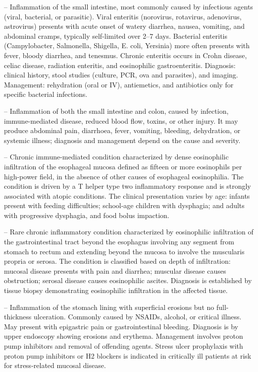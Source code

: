 -- Inflammation of the small intestine, most commonly caused by infectious agents (viral, bacterial, or parasitic). Viral enteritis (norovirus, rotavirus, adenovirus, astrovirus) presents with acute onset of watery diarrhea, nausea, vomiting, and abdominal cramps, typically self-limited over 2--7 days. Bacterial enteritis (Campylobacter, Salmonella, Shigella, E. coli, Yersinia) more often presents with fever, bloody diarrhea, and tenesmus. Chronic enteritis occurs in Crohn disease, celiac disease, radiation enteritis, and eosinophilic gastroenteritis. Diagnosis: clinical history, stool studies (culture, PCR, ova and parasites), and imaging. Management: rehydration (oral or IV), antiemetics, and antibiotics only for specific bacterial infections.

-- Inflammation of both the small intestine and colon, caused by infection, immune-mediated disease, reduced blood flow, toxins, or other injury. It may produce abdominal pain, diarrhoea, fever, vomiting, bleeding, dehydration, or systemic illness; diagnosis and management depend on the cause and severity.

-- Chronic immune-mediated condition characterized by dense eosinophilic infiltration of the esophageal mucosa defined as fifteen or more eosinophils per high-power field, in the absence of other causes of esophageal eosinophilia. The condition is driven by a T helper type two inflammatory response and is strongly associated with atopic conditions. The clinical presentation varies by age: infants present with feeding difficulties; school-age children with dysphagia; and adults with progressive dysphagia, and food bolus impaction.

-- Rare chronic inflammatory condition characterized by eosinophilic infiltration of the gastrointestinal tract beyond the esophagus involving any segment from stomach to rectum and extending beyond the mucosa to involve the muscularis propria or serosa. The condition is classified based on depth of infiltration: mucosal disease presents with pain and diarrhea; muscular disease causes obstruction; serosal disease causes eosinophilic ascites. Diagnosis is established by tissue biopsy demonstrating eosinophilic infiltration in the affected tissue.

-- Inflammation of the stomach lining with superficial erosions but no full-thickness ulceration. Commonly caused by NSAIDs, alcohol, or critical illness. May present with epigastric pain or gastrointestinal bleeding. Diagnosis is by upper endoscopy showing erosions and erythema. Management involves proton pump inhibitors and removal of offending agents. Stress ulcer prophylaxis with proton pump inhibitors or H2 blockers is indicated in critically ill patients at risk for stress-related mucosal disease.

